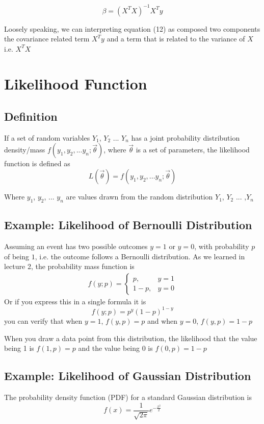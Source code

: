 \documentclass[12pt, oneside]{article}
\begin{document}
\begin{equation}
\beta=({X^T}{X})^{-1}{X^{T}}{y}
\end{equation}

Loosely speaking, we can interpreting equation (12) as composed two components the covariance related term $X^{T}y$ and a term that is related to the variance of $X$ i.e. ${X^T}{X}$


\section{Likelihood Function}
\subsection{Definition}
If a set of random variables $Y_1$, $Y_2$ ... $Y_n$ has a joint probability distribution density/mass $f(y_1, y_2, ...y_n;\vec{\theta})$, where $\vec{\theta}$ is a set of parameters, the likelihood function is defined as 
\begin{equation}
L(\vec{\theta})=f(y_1, y_2, ...y_n; \vec{\theta})
\end{equation}

Where $y_1$, $y_2$, ... $y_n$ are values drawn from the random distribution $Y_1$, $Y_2$ ... ,$Y_n$ 

\subsection{Example: Likelihood of Bernoulli Distribution}
Assuming an event has two possible outcomes $y=1$ or $y=0$, with probability $p$ of being $1$, i.e. the outcome follows a Bernoulli distribution. As we learned in lecture 2, the probability mass function is 
\begin{align*}
f(y; p)=
\begin{cases}
p, &y=1\\
1-p,  &y=0
\end{cases}
\end{align*}
Or if you express this in a single formula it is 
$$f(y;p)=p^y(1-p)^{1-y}$$
you can verify that when $y=1$, $f(y, p)=p$ and when $y=0$, $f(y, p)=1-p$

When you draw a data point from this distribution, the likelihood that the value being 1 is $f(1, p)=p$ and the value being 0 is $f(0, p)=1-p$

\subsection{Example: Likelihood of Gaussian Distribution}
The probability density function (PDF) for a standard Gaussian distribution is 
$$f(x)=\frac{1}{\sqrt{2\pi}}e^{-\frac{x^2}{2}}$$
\end{document}
